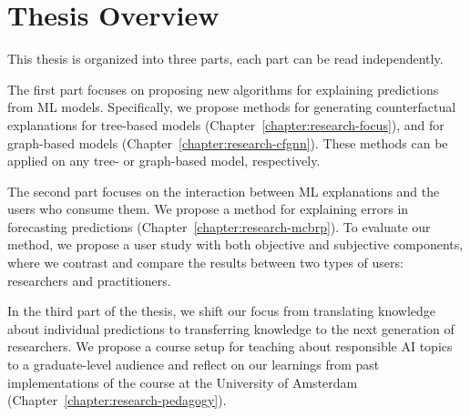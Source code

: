 
\section{Thesis Overview}
\label{section:introduction:overview}

This thesis is organized into three parts, each part can be read independently. 

The first part focuses on proposing new algorithms for explaining predictions from ML models. 
Specifically, we propose methods for generating counterfactual explanations for tree-based models (Chapter~\ref{chapter:research-focus}), and for graph-based models (Chapter~\ref{chapter:research-cfgnn}). 
These methods can be applied on any tree- or graph-based model, respectively.

The second part focuses on the interaction between ML explanations and the users who consume them. 
We propose a method for explaining errors in forecasting predictions (Chapter~\ref{chapter:research-mcbrp}). 
To evaluate our method, we propose a user study with both objective and subjective components, where we contrast and compare the results between two types of users: researchers and practitioners. 


In the third part of the thesis, we shift our focus from translating knowledge about individual predictions to transferring knowledge to the next generation of researchers. 
We propose a course setup for teaching about responsible AI topics to a graduate-level audience and reflect on our learnings from past implementations of the course at the University of Amsterdam (Chapter~\ref{chapter:research-pedagogy}). 


